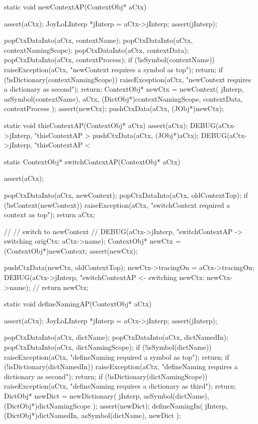 \startCCode
static void newContextAP(ContextObj* aCtx) {
  assert(aCtx);
  JoyLoLInterp *jInterp = aCtx->jInterp;
  assert(jInterp);

  popCtxDataInto(aCtx, contextName);
  popCtxDataInto(aCtx, contextNamingScope);
  popCtxDataInto(aCtx, contextData);
  popCtxDataInto(aCtx, contextProcess);
  if (!isSymbol(contextName)) {
    raiseException(aCtx,
      "newContext requires a symbol as top");
    return;
  }
  if (!isDictionary(contextNamingScope)) {
    raiseException(aCtx,
      "newContext requires a dictionary as second");
    return;
  }
  ContextObj* newCtx = newContext(
    jInterp,
    asSymbol(contextName),
    aCtx,
    (DictObj*)contextNamingScope,
    contextData,
    contextProcess
  );
  assert(newCtx);
  pushCtxData(aCtx, (JObj*)newCtx);
}
\stopCCode

\startCCode
static void thisContextAP(ContextObj* aCtx) {
  assert(aCtx);
  DEBUG(aCtx->jInterp, "thisContextAP > %
  pushCtxData(aCtx, (JObj*)aCtx);
  DEBUG(aCtx->jInterp, "thisContextAP < %
}
\stopCCode

\startCCode
static ContextObj* switchContextAP(ContextObj* aCtx) {
  assert(aCtx);

  popCtxDataInto(aCtx, newContext);
  popCtxDataInto(aCtx, oldContextTop);
  if (!isContext(newContext)) {
    raiseException(aCtx,
      "switchContext required a context as top");
    return aCtx;
  }
  
  //
  // switch to newContext
  //
  DEBUG(aCtx->jInterp, "switchContextAP -> switching origCtx: %
    aCtx->name);
  ContextObj* newCtx = (ContextObj*)newContext;
  assert(newCtx);

  pushCtxData(newCtx, oldContextTop);
  newCtx->tracingOn = aCtx->tracingOn;
  DEBUG(aCtx->jInterp, "switchContextAP <- switching newCtx: %
            newCtx->name);
  //
  return newCtx;
}
\stopCCode

\startCCode
static void defineNamingAP(ContextObj* aCtx) {
  assert(aCtx);
  JoyLoLInterp *jInterp = aCtx->jInterp;
  assert(jInterp);
  
  popCtxDataInto(aCtx, dictName);
  popCtxDataInto(aCtx, dictNamedIn);
  popCtxDataInto(aCtx, dictNamingScope);
  if (!isSymbol(dictName)) {
    raiseException(aCtx,
      "defineNaming required a symbol as top");
    return;
  }
  if (!isDictionary(dictNamedIn)) {
    raiseException(aCtx,
      "defineNaming requires a dictionary as second");
    return;
  }
  if (!isDictionary(dictNamingScope)) {
    raiseException(aCtx,
      "defineNaming requires a dictionary as third");
    return;
  }
  DictObj* newDict =
    newDictionary(
      jInterp,
      asSymbol(dictName),
      (DictObj*)dictNamingScope
    );
  assert(newDict);
  defineNamingIn(
    jInterp,
    (DictObj*)dictNamedIn,
    asSymbol(dictName),
    newDict
  );
}
\stopCCode

